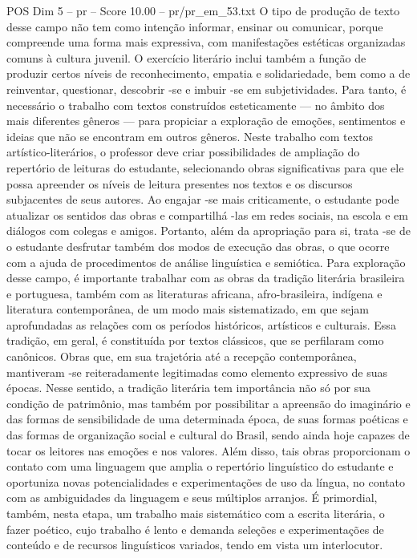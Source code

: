 \begin{textsample}{POS Dim 5 – pr – Score 10.00 – pr/pr\_em\_53.txt}
O tipo de produção de texto desse campo não tem como intenção informar, ensinar ou comunicar, porque compreende uma forma mais expressiva, com manifestações estéticas organizadas comuns à cultura juvenil.
O exercício literário inclui também a função de produzir certos níveis de reconhecimento, empatia e solidariedade, bem como a de reinventar, questionar, descobrir -se e imbuir -se em subjetividades.
Para tanto, é necessário o trabalho com textos construídos esteticamente — no âmbito dos mais diferentes gêneros — para propiciar a exploração de emoções, sentimentos e ideias que não se encontram em outros gêneros.
Neste trabalho com textos artístico-literários, o professor deve criar possibilidades de ampliação do repertório de leituras do estudante, selecionando obras significativas para que ele possa apreender os níveis de leitura presentes nos textos e os discursos subjacentes de seus autores.
Ao engajar -se mais criticamente, o estudante pode atualizar os sentidos das obras e compartilhá -las em redes sociais, na escola e em diálogos com colegas e amigos.
Portanto, além da apropriação para si, trata -se de o estudante desfrutar também dos modos de execução das obras, o que ocorre com a ajuda de procedimentos de análise linguística e semiótica.
Para exploração desse campo, é importante trabalhar com as obras da tradição literária brasileira e portuguesa, também com as literaturas africana, afro-brasileira, indígena e literatura contemporânea, de um modo mais sistematizado, em que sejam aprofundadas as relações com os períodos históricos, artísticos e culturais.
Essa tradição, em geral, é constituída por textos clássicos, que se perfilaram como canônicos.
Obras que, em sua trajetória até a recepção contemporânea, mantiveram -se reiteradamente legitimadas como elemento expressivo de suas épocas.
Nesse sentido, a tradição literária tem importância não só por sua condição de patrimônio, mas também por possibilitar a apreensão do imaginário e das formas de sensibilidade de uma determinada época, de suas formas poéticas e das formas de organização social e cultural do Brasil, sendo ainda hoje capazes de tocar os leitores nas emoções e nos valores.
Além disso, tais obras proporcionam o contato com uma linguagem que amplia o repertório linguístico do estudante e oportuniza novas potencialidades e experimentações de uso da língua, no contato com as ambiguidades da linguagem e seus múltiplos arranjos.
É primordial, também, nesta etapa, um trabalho mais sistemático com a escrita literária, o fazer poético, cujo trabalho é lento e demanda seleções e experimentações de conteúdo e de recursos linguísticos variados, tendo em vista um interlocutor.

\end{textsample}
